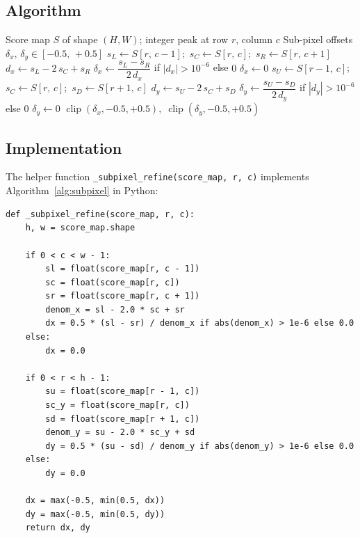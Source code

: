 \documentclass[12pt,a4paper]{article}
\begin{document}
\subsection{Algorithm}

\begin{algorithm}[H]
  \caption{\textsc{SubpixelRefine}$(S,\,r,\,c)$}
  \label{alg:subpixel}
  \begin{algorithmic}[1]
    \Require Score map $S$ of shape $(H,W)$; integer peak at row $r$, column $c$
    \Ensure  Sub-pixel offsets $\delta_x,\,\delta_y \in [-0.5,\,+0.5]$
      \State $s_L \gets S[r,\,c-1]$;\ $s_C \gets S[r,\,c]$;\ $s_R \gets S[r,\,c+1]$
      \State $d_x \gets s_L - 2\,s_C + s_R$
      \State $\delta_x \gets \dfrac{s_L - s_R}{2\,d_x}$ if $|d_x|>10^{-6}$ else $0$
    \Else
      \State $\delta_x \gets 0$
    \EndIf
      \State $s_U \gets S[r-1,\,c]$;\ $s_C \gets S[r,\,c]$;\ $s_D \gets S[r+1,\,c]$
      \State $d_y \gets s_U - 2\,s_C + s_D$
      \State $\delta_y \gets \dfrac{s_U - s_D}{2\,d_y}$ if $|d_y|>10^{-6}$ else $0$
    \Else
      \State $\delta_y \gets 0$
    \EndIf
    \State \Return $\operatorname{clip}(\delta_x,{-0.5},{+0.5}),\;
                    \operatorname{clip}(\delta_y,{-0.5},{+0.5})$
  \end{algorithmic}
\end{algorithm}

\subsection{Implementation}

The helper function \texttt{\_subpixel\_refine(score\_map, r, c)} implements
Algorithm~\ref{alg:subpixel} in Python:

\begin{lstlisting}[style=python,
  caption={\texttt{\_subpixel\_refine} --- parabolic sub-pixel peak localisation},
  label={lst:subpixel}]
def _subpixel_refine(score_map, r, c):
    h, w = score_map.shape

    if 0 < c < w - 1:
        sl = float(score_map[r, c - 1])
        sc = float(score_map[r, c])
        sr = float(score_map[r, c + 1])
        denom_x = sl - 2.0 * sc + sr
        dx = 0.5 * (sl - sr) / denom_x if abs(denom_x) > 1e-6 else 0.0
    else:
        dx = 0.0

    if 0 < r < h - 1:
        su = float(score_map[r - 1, c])
        sc_y = float(score_map[r, c])
        sd = float(score_map[r + 1, c])
        denom_y = su - 2.0 * sc_y + sd
        dy = 0.5 * (su - sd) / denom_y if abs(denom_y) > 1e-6 else 0.0
    else:
        dy = 0.0

    dx = max(-0.5, min(0.5, dx))
    dy = max(-0.5, min(0.5, dy))
    return dx, dy
\end{lstlisting}
\end{document}
